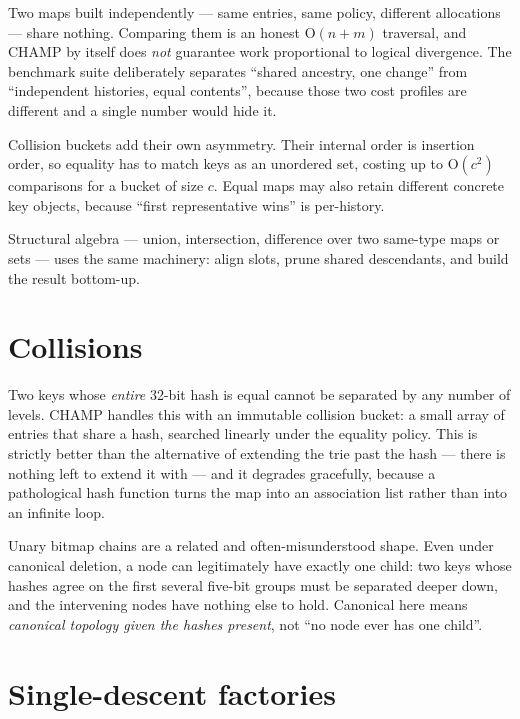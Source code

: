 \documentclass[11pt,twoside,openright]{book}
\newcommand{\bigoh}[1]{$\mathrm{O}(#1)$}
\begin{document}
\begin{caveatbox}
Two maps built independently --- same entries, same policy, different
allocations --- share nothing. Comparing them is an honest \bigoh{n+m}
traversal, and CHAMP by itself does \emph{not} guarantee work proportional to
logical divergence. The benchmark suite deliberately separates
``shared ancestry, one change'' from ``independent histories, equal contents'',
because those two cost profiles are different and a single number would hide it.

Collision buckets add their own asymmetry. Their internal order is insertion
order, so equality has to match keys as an unordered set, costing up to
\bigoh{c^2} comparisons for a bucket of size $c$. Equal maps may also retain
different concrete key objects, because ``first representative wins'' is
per-history.
\end{caveatbox}

Structural algebra --- union, intersection, difference over two same-type maps or
sets --- uses the same machinery: align slots, prune shared descendants, and
build the result bottom-up.

\section{Collisions}

Two keys whose \emph{entire} 32-bit hash is equal cannot be separated by any
number of levels. CHAMP handles this with an immutable collision bucket: a small
array of entries that share a hash, searched linearly under the equality policy.
This is strictly better than the alternative of extending the trie past the hash
--- there is nothing left to extend it with --- and it degrades gracefully,
because a pathological hash function turns the map into an association list
rather than into an infinite loop.

Unary bitmap chains are a related and often-misunderstood shape. Even under
canonical deletion, a node can legitimately have exactly one child: two keys
whose hashes agree on the first several five-bit groups must be separated deeper
down, and the intervening nodes have nothing else to hold. Canonical here means
\emph{canonical topology given the hashes present}, not ``no node ever has one
child''.

\section{Single-descent factories}
\end{document}

